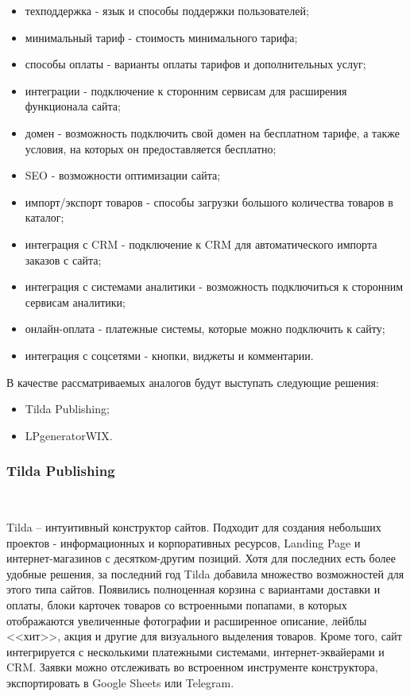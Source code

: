 \begin{itemize}
  \item техподдержка - язык и способы поддержки пользователей;
  \item минимальный тариф - стоимость минимального тарифа;
  \item способы оплаты - варианты оплаты тарифов и дополнительных услуг;
  \item интеграции - подключение к сторонним сервисам для расширения функционала сайта;
  \item домен - возможность подключить свой домен на бесплатном тарифе, а также условия, на которых он предоставляется бесплатно;
  \item SEO - возможности оптимизации сайта;
  \item импорт/экспорт товаров - способы загрузки большого количества товаров в каталог;
  \item интеграция с CRM - подключение к CRM для автоматического импорта заказов с сайта;
  \item интеграция с системами аналитики - возможность подключиться к сторонним сервисам аналитики;
  \item онлайн-оплата - платежные системы, которые можно подключить к сайту;
  \item интеграция с соцсетями - кнопки, виджеты и комментарии.
\end{itemize}

В качестве рассматриваемых аналогов будут выступать следующие решения:
\begin{itemize}
  \item Tilda Publishing;
  \item LPgeneratorWIX.
\end{itemize}

\subsubsection{Tilda Publishing}
\

Tilda – интуитивный конструктор сайтов. Подходит для создания небольших проектов - информационных и корпоративных ресурсов, Landing Page и интернет-магазинов с десятком-другим позиций. Хотя для последних есть более удобные решения, за последний год Tilda добавила множество возможностей для этого типа сайтов. Появились полноценная корзина с вариантами доставки и оплаты, блоки карточек товаров со встроенными попапами, в которых отображаются увеличенные фотографии и расширенное описание, лейблы <<хит>>, акция и другие для визуального выделения товаров. Кроме того, сайт интегрируется с несколькими платежными системами, интернет-эквайерами и CRM. Заявки можно отслеживать во встроенном инструменте конструктора, экспортировать в Google Sheets или Telegram.

